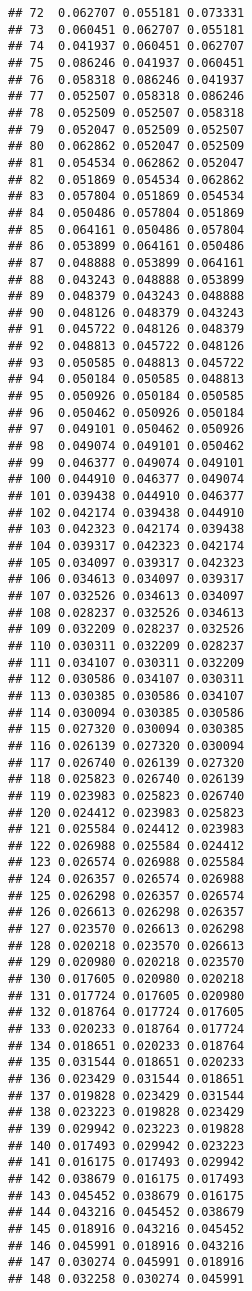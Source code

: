 \documentclass[]{article}
\begin{document}
\begin{verbatim}
## 72  0.062707 0.055181 0.073331
## 73  0.060451 0.062707 0.055181
## 74  0.041937 0.060451 0.062707
## 75  0.086246 0.041937 0.060451
## 76  0.058318 0.086246 0.041937
## 77  0.052507 0.058318 0.086246
## 78  0.052509 0.052507 0.058318
## 79  0.052047 0.052509 0.052507
## 80  0.062862 0.052047 0.052509
## 81  0.054534 0.062862 0.052047
## 82  0.051869 0.054534 0.062862
## 83  0.057804 0.051869 0.054534
## 84  0.050486 0.057804 0.051869
## 85  0.064161 0.050486 0.057804
## 86  0.053899 0.064161 0.050486
## 87  0.048888 0.053899 0.064161
## 88  0.043243 0.048888 0.053899
## 89  0.048379 0.043243 0.048888
## 90  0.048126 0.048379 0.043243
## 91  0.045722 0.048126 0.048379
## 92  0.048813 0.045722 0.048126
## 93  0.050585 0.048813 0.045722
## 94  0.050184 0.050585 0.048813
## 95  0.050926 0.050184 0.050585
## 96  0.050462 0.050926 0.050184
## 97  0.049101 0.050462 0.050926
## 98  0.049074 0.049101 0.050462
## 99  0.046377 0.049074 0.049101
## 100 0.044910 0.046377 0.049074
## 101 0.039438 0.044910 0.046377
## 102 0.042174 0.039438 0.044910
## 103 0.042323 0.042174 0.039438
## 104 0.039317 0.042323 0.042174
## 105 0.034097 0.039317 0.042323
## 106 0.034613 0.034097 0.039317
## 107 0.032526 0.034613 0.034097
## 108 0.028237 0.032526 0.034613
## 109 0.032209 0.028237 0.032526
## 110 0.030311 0.032209 0.028237
## 111 0.034107 0.030311 0.032209
## 112 0.030586 0.034107 0.030311
## 113 0.030385 0.030586 0.034107
## 114 0.030094 0.030385 0.030586
## 115 0.027320 0.030094 0.030385
## 116 0.026139 0.027320 0.030094
## 117 0.026740 0.026139 0.027320
## 118 0.025823 0.026740 0.026139
## 119 0.023983 0.025823 0.026740
## 120 0.024412 0.023983 0.025823
## 121 0.025584 0.024412 0.023983
## 122 0.026988 0.025584 0.024412
## 123 0.026574 0.026988 0.025584
## 124 0.026357 0.026574 0.026988
## 125 0.026298 0.026357 0.026574
## 126 0.026613 0.026298 0.026357
## 127 0.023570 0.026613 0.026298
## 128 0.020218 0.023570 0.026613
## 129 0.020980 0.020218 0.023570
## 130 0.017605 0.020980 0.020218
## 131 0.017724 0.017605 0.020980
## 132 0.018764 0.017724 0.017605
## 133 0.020233 0.018764 0.017724
## 134 0.018651 0.020233 0.018764
## 135 0.031544 0.018651 0.020233
## 136 0.023429 0.031544 0.018651
## 137 0.019828 0.023429 0.031544
## 138 0.023223 0.019828 0.023429
## 139 0.029942 0.023223 0.019828
## 140 0.017493 0.029942 0.023223
## 141 0.016175 0.017493 0.029942
## 142 0.038679 0.016175 0.017493
## 143 0.045452 0.038679 0.016175
## 144 0.043216 0.045452 0.038679
## 145 0.018916 0.043216 0.045452
## 146 0.045991 0.018916 0.043216
## 147 0.030274 0.045991 0.018916
## 148 0.032258 0.030274 0.045991

\end{verbatim}
\end{document}
